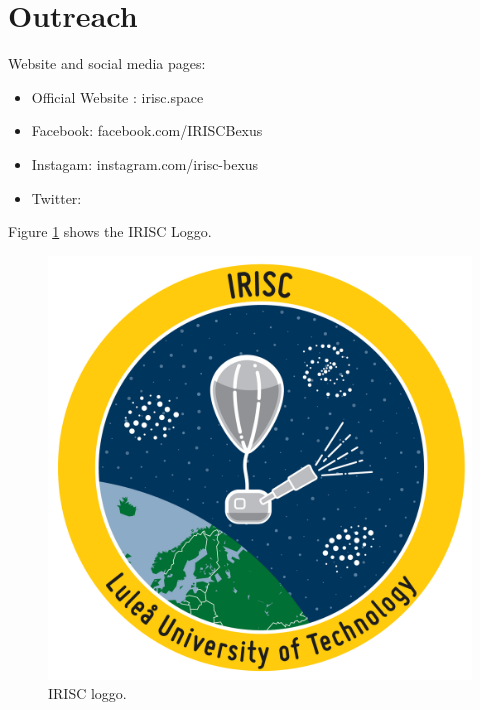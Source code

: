 \newpage
\section{Outreach} \label{sec:appB}

Website and social media pages: 

\begin{itemize}
	\item Official Website : irisc.space
	\item Facebook: facebook.com/IRISCBexus
	\item Instagam: instagram.com/irisc-bexus
	\item Twitter: 
\end{itemize}

Figure \ref{fig:loggo} shows the IRISC Loggo.

\begin{figure}[H]
	\centering
	\includegraphics[width=\textwidth]{0-cover/img/logo-irisc.png}
	\caption{IRISC loggo.}
	\label{fig:loggo}
\end{figure}